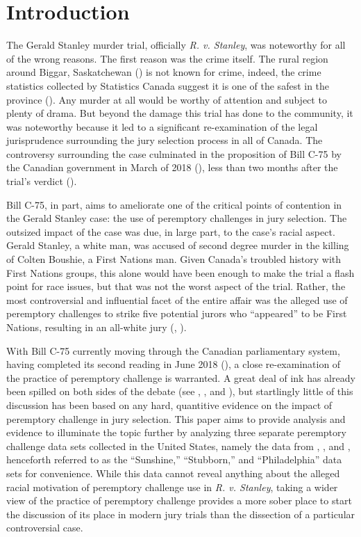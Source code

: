\chapter{Introduction} \label{c:introduction}

The Gerald Stanley murder trial, officially \textit{R. v. Stanley}, was noteworthy for all of the wrong reasons. The first reason
was the crime itself. The rural region around Biggar, Saskatchewan (\cite{StanleyWitnessAccounts}) is not known for crime, indeed,
the crime statistics collected by Statistics Canada suggest it is one of the safest in the province
(\cite{SaskatchewanCrime}). Any murder at all would be worthy of attention and subject to plenty of drama. But beyond the damage
this trial has done to the community, it was noteworthy because it led to a significant re-examination of the legal jurisprudence
surrounding the jury selection process in all of Canada. The controversy surrounding the case culminated in the proposition of
Bill C-75 by the Canadian government in March of 2018 (\cite{billc75}), less than two months after the trial's verdict
(\cite{GeraldStanleyVerdict}).

Bill C-75, in part, aims to ameliorate one of the critical points of contention in the Gerald Stanley case: the use of peremptory
challenges in jury selection. The outsized impact of the case was due, in large part, to the case's racial aspect. Gerald Stanley,
a white man, was accused of second degree murder in the killing of Colten Boushie, a First Nations man. Given Canada's troubled
history with First Nations groups, this alone would have been enough to make the trial a flash point for race issues, but that was
not the worst aspect of the trial. Rather, the most controversial and influential facet of the entire affair was the alleged use
of peremptory challenges to strike five potential jurors who ``appeared'' to be First Nations, resulting in an all-white jury
(\cite{fiverejected}, \cite{fraughthistory}).

With Bill C-75 currently moving through the Canadian parliamentary system, having completed its second reading in June
2018 (\cite{c75legisinfo}), a close re-examination of the practice of peremptory challenge is warranted. A great deal of ink has
already been spilled on both sides of the debate (see \cite{peremparegood}, \cite{bothwrong}, and \cite{goodfirststep}), but startlingly
little of this discussion has been based on any hard, quantitive evidence on the impact of peremptory challenge in jury
selection. This paper aims to provide analysis and evidence to illuminate the topic further by analyzing three separate peremptory
challenge data sets collected in the United States, namely the data from \cite{JurySunshineProj}, \cite{StubbornLegacy}, and
\cite{PerempChalMurder}, henceforth referred to as the ``Sunshine,'' ``Stubborn,'' and ``Philadelphia'' data sets for
convenience. While this data cannot reveal anything about the alleged racial motivation of peremptory challenge use in
\textit{R. v. Stanley}, taking a wider view of the practice of peremptory challenge provides a more sober place to start 
the discussion of its place in modern jury trials than the dissection of a particular controversial case.

